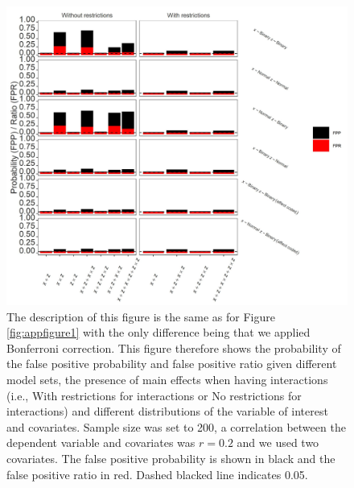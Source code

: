 \begin{figure}[hbt!]
\includegraphics[scale=0.95]{R/Analysis/Result/Figures/Figure1ASIBon.jpeg}
\centering
\caption{The description of this figure is the same as for Figure \ref{fig:appfigure1} with the only difference being that we applied Bonferroni correction. This figure therefore shows the probability of the false positive probability and false positive ratio given different model sets, the presence of main effects when having interactions (i.e., With restrictions for interactions or No restrictions for interactions) and different distributions of the variable of interest and covariates. Sample size was set to 200, a correlation between the dependent variable and covariates was $\textit{r}=0.2$ and we used two covariates. The false positive probability is shown in black and the false positive ratio in red. Dashed blacked line indicates 0.05. }
\label{fig:appfigure7}
\end{figure}

\begin{landscape}

\end{landscape}


